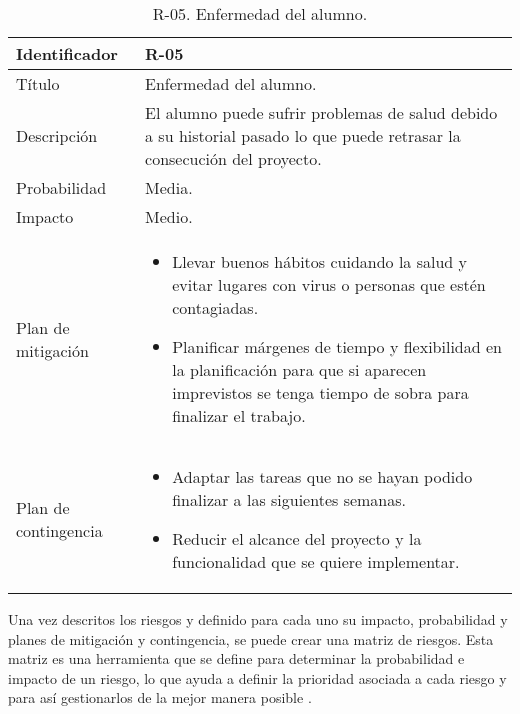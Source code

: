 \begin{table}[H]
  \centering
\begin{tabularx}{1\textwidth} { 
  | >{\centering\arraybackslash}X 
  | >{\centering\arraybackslash}X 
  |  }
 \hline
  Identificador & R-05 \\
 \hline
 Título & Enfermedad del alumno. \\
 \hline
 Descripción  & El alumno puede sufrir problemas de salud debido a su historial pasado lo que puede retrasar la consecución del proyecto.  \\
\hline
 Probabilidad  & Media.    \\
 \hline
 Impacto  & Medio.   \\
 \hline
 Plan de mitigación  & \begin{itemize}
     \item Llevar buenos hábitos cuidando la salud y evitar lugares con virus o personas que estén contagiadas.
      \item Planificar márgenes de tiempo y flexibilidad en la planificación para que si aparecen imprevistos se tenga tiempo de sobra para finalizar el trabajo.

 \end{itemize}   \\
 \hline
  Plan de contingencia  & \begin{itemize}
     \item Adaptar las tareas que no se hayan podido finalizar a las siguientes semanas.
     \item Reducir el alcance del proyecto y la funcionalidad que se quiere implementar.
      
 \end{itemize}   \\
 

  \hline
\end{tabularx}
\caption{R-05. Enfermedad del alumno.}
\label{table:R-05}
\end{table}







Una vez descritos los riesgos y definido para cada uno su impacto, probabilidad y planes de mitigación y contingencia, se puede crear una matriz de riesgos. Esta matriz es una herramienta que se define para determinar la probabilidad e impacto de un riesgo, lo que ayuda a definir la prioridad asociada a cada riesgo y para así gestionarlos de la mejor manera posible \cite{matriz-riesgos}.

